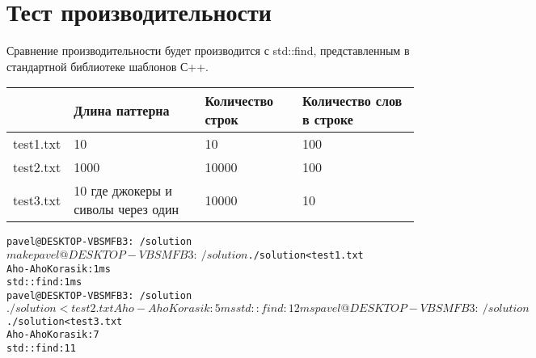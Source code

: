 \section{Тест производительности}
Сравнение производительности будет производится с std::find, представленным в стандартной библиотеке шаблонов С++. 

\begin{longtable}{|p{3cm}|p{3cm}|p{3cm}|p{3cm}|}
    \hline
    \rowcolor{lightgray}
     &Длина паттерна&Количество строк&Количество слов в строке\\
    \hline
    test1.txt&10&10&100\\
    \hline
    test2.txt&1000&10000&100\\
    \hline
    test3.txt&10 где джокеры и сиволы через один&10000&10\\
    \hline
\end{longtable}
\begin{alltt}
    pavel@DESKTOP-VBSMFB3:~/solution$ make
    pavel@DESKTOP-VBSMFB3:~/solution$ ./solution < test1.txt
    Aho-AhoKorasik: 1ms
    std::find: 1ms
    pavel@DESKTOP-VBSMFB3:~/solution$ ./solution < test2.txt
    Aho-AhoKorasik: 5ms
    std::find: 12ms
    pavel@DESKTOP-VBSMFB3:~/solution$ ./solution < test3.txt
    Aho-AhoKorasik: 7
    std::find: 11
\end{alltt}

\pagebreak

